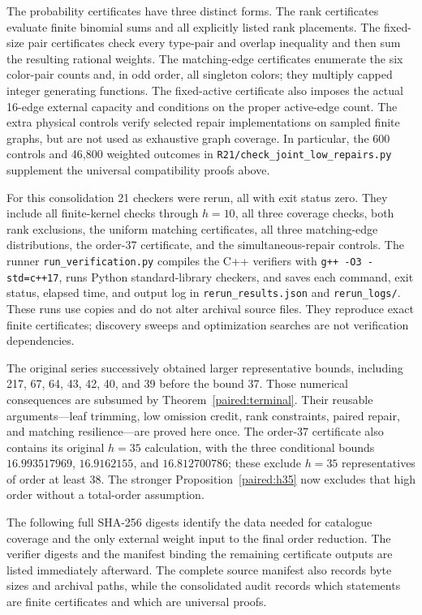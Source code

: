 \documentclass[11pt,a4paper]{article}
\theoremstyle{definition}\newtheorem{definition}[theorem]{Definition}
\theoremstyle{remark}\newtheorem{remark}[theorem]{Remark}
\begin{document}
The probability certificates have three distinct forms. The rank
certificates evaluate finite binomial sums and all explicitly listed
rank placements. The fixed-size pair certificates check every
type-pair and overlap inequality and then sum the resulting rational
weights. The matching-edge certificates enumerate the six color-pair
counts and, in odd order, all singleton colors; they multiply capped
integer generating functions. The fixed-active certificate also
imposes the actual 16-edge external capacity and conditions on the
proper active-edge count. The extra physical controls verify selected
repair implementations on sampled finite graphs, but are not used
as exhaustive graph coverage. In particular, the 600 controls and
46,800 weighted outcomes in
\nolinkurl{R21/check_joint_low_repairs.py} supplement the universal
compatibility proofs above.

For this consolidation 21 checkers were rerun, all with exit status
zero. They include all finite-kernel checks through $h=10$, all
three coverage checks, both rank exclusions, the uniform matching
certificates, all three matching-edge distributions, the order-37
certificate, and the simultaneous-repair controls. The runner
\nolinkurl{run_verification.py} compiles the C++ verifiers with
\nolinkurl{g++ -O3 -std=c++17}, runs Python standard-library checkers,
and saves each command, exit status, elapsed time, and output log in
\nolinkurl{rerun_results.json} and \nolinkurl{rerun_logs/}.
These runs use copies and do not alter archival source files.
They reproduce exact finite certificates; discovery sweeps and
optimization searches are not verification dependencies.

The original series successively obtained larger representative
bounds, including 217, 67, 64, 43, 42, 40, and 39 before the bound
37. Those numerical consequences are subsumed by
Theorem~\ref{paired:terminal}. Their reusable arguments---leaf
trimming, low omission credit, rank constraints, paired repair, and
matching resilience---are proved here once. The order-37 certificate
also contains its original $h=35$ calculation, with the three
conditional bounds $16.993517969$, $16.9162155$, and $16.812700786$;
these exclude $h=35$ representatives of order at least 38. The
stronger Proposition~\ref{paired:h35} now excludes that high order
without a total-order assumption.

The following full SHA-256 digests identify the data needed for
catalogue coverage and the only external weight input to the final
order reduction. The verifier digests and the manifest binding the
remaining certificate outputs are listed immediately afterward. The complete source manifest
also records byte sizes and archival paths, while the consolidated
audit records which statements are finite certificates and which
are universal proofs.
\end{document}
